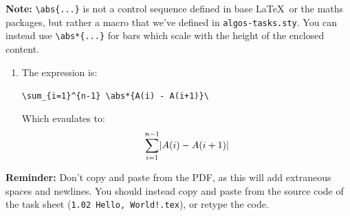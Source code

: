 \documentclass[12pt]{article}
\begin{document}
\begin{question}
\begin{enumerate}
    \textbf{Note:} \verb|\abs{...}| is not a control sequence defined in base \LaTeX\ or the maths packages, but rather a macro that we've defined in \texttt{algos-tasks.sty}. You can instead use \verb|\abs*{...}| for bars which scale with the height of the enclosed content.
    \begin{enumerate}
        \item The expression is: 
        \begin{center}
        \verb|\sum_{i=1}^{n-1} \abs*{A(i) - A(i+1)}\|
        \end{center}
        Which evaulates to: 
        \[\sum_{i=1}^{n-1}  \abs*{A(i) - A(i+1)}\]
    \end{enumerate}
\end{enumerate}

\textbf{Reminder:} Don't copy and paste from the PDF, as this will add extraneous spaces and newlines. You should instead copy and paste from the source code of the task sheet (\texttt{1.02 Hello, World!.tex}), or retype the code.
\end{question}
\end{document}
